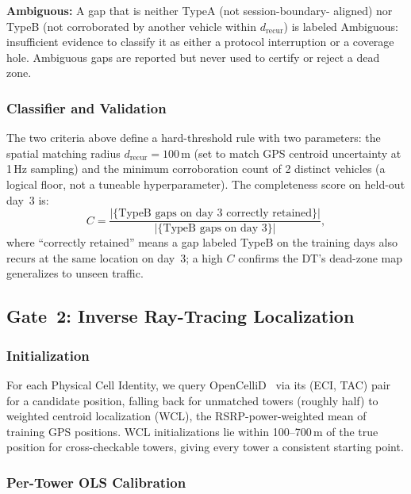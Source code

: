 \documentclass[conference]{IEEEtran}
\begin{document}
\textbf{Ambiguous:} A gap that is neither TypeA (not session-boundary-
aligned) nor TypeB (not corroborated by another vehicle within
$d_\text{recur}$) is labeled Ambiguous: insufficient evidence to classify
it as either a protocol interruption or a coverage hole. Ambiguous gaps
are reported but never used to certify or reject a dead zone.

\subsubsection{Classifier and Validation}

The two criteria above define a hard-threshold rule with two
parameters: the spatial matching radius $d_\text{recur}=100$\,m (set to
match GPS centroid uncertainty at 1\,Hz sampling) and the minimum
corroboration count of 2 distinct vehicles (a logical floor, not a
tuneable hyperparameter). The completeness score on held-out day~3 is:
\begin{equation}
  C = \frac{|\{\text{TypeB gaps on day~3 correctly retained}\}|}
           {|\{\text{TypeB gaps on day~3}\}|},
  \label{eq:completeness}
\end{equation}
where ``correctly retained'' means a gap labeled TypeB on the training
days also recurs at the same location on day~3; a high $C$ confirms
the DT's dead-zone map generalizes to unseen traffic.

\subsection{Gate~2: Inverse Ray-Tracing Localization}
\label{sec:gate2}

\subsubsection{Initialization}

For each Physical Cell Identity, we query
OpenCelliD~\cite{opencellid2024} via its (ECI, TAC) pair for a
candidate position, falling back for unmatched towers (roughly half) to
weighted centroid localization (WCL), the RSRP-power-weighted mean of
training GPS positions. WCL initializations lie within 100--700\,m of
the true position for cross-checkable towers, giving every tower a
consistent starting point.

\subsubsection{Per-Tower OLS Calibration}
\label{sec:ols}
\end{document}
